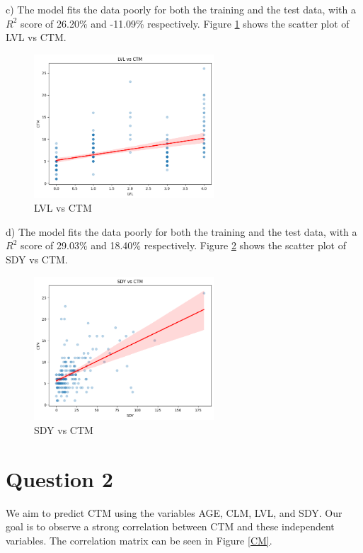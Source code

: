 \documentclass{article}
\begin{document}
\noindent c)  The model fits the data poorly for both the training and the test data, with a $R^2$ score of 26.20\%  and -11.09\% respectively. Figure \ref{LVLCTM} shows the scatter plot of LVL vs CTM.

\begin{figure}[H]
\centering
\includegraphics[width=0.6\textwidth]{LVL.png}
\caption{LVL vs CTM}
\label{LVLCTM}
\end{figure}

\noindent d)  The model fits the data poorly for both the training and the test data, with a $R^2$ score of 29.03\%  and 18.40\% respectively. Figure \ref{SDYCTM} shows the scatter plot of SDY vs CTM.

\begin{figure}[H]
\centering
\includegraphics[width=0.6\textwidth]{SDY.png}
\caption{SDY vs CTM}
\label{SDYCTM}
\end{figure}

\section*{Question 2}
We aim to predict CTM using the variables AGE, CLM, LVL, and SDY. Our goal is to observe a strong correlation between CTM and these independent variables. The correlation matrix can be seen in Figure \ref{CM}.
\end{document}
